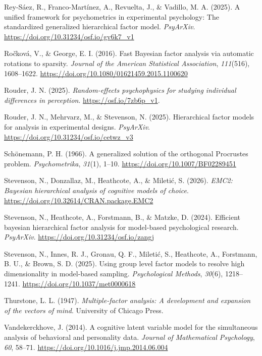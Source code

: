 \documentclass[
  man,
  longtable,
  nolmodern,
  notxfonts,
  notimes,
  colorlinks=true,linkcolor=blue,citecolor=blue,urlcolor=blue]{apa7}
\newlength{\cslhangindent}
\newenvironment{CSLReferences}[2] %
 {\begin{list}{}{%
  \setlength{\itemindent}{0pt}
  \setlength{\leftmargin}{0pt}
  \setlength{\parsep}{0pt}
  \ifodd #1
   \setlength{\leftmargin}{\cslhangindent}
   \setlength{\itemindent}{-1\cslhangindent}
  \fi
  \setlength{\itemsep}{#2\baselineskip}}}
 {\end{list}}
\theoremstyle{plain}
\theoremstyle{plain}
\theoremstyle{remark}
\begin{document}
\begin{CSLReferences}{1}{0}
Rey-Sáez, R., Franco-Martínez, A., Revuelta, J., \& Vadillo, M. A.
(2025). A unified framework for psychometrics in experimental
psychology: The standardized generalized hierarchical factor model.
\emph{PsyArXiv}. \url{https://doi.org/10.31234/osf.io/gv6k7_v1}

Ročková, V., \& George, E. I. (2016). Fast {Bayesian} factor analysis
via automatic rotations to sparsity. \emph{Journal of the American
Statistical Association}, \emph{111}(516), 1608--1622.
\url{https://doi.org/10.1080/01621459.2015.1100620}

Rouder, J. N. (2025). \emph{Random-effects psychophysics for studying
individual differences in perception}. \url{https://osf.io/7zb6p_v1}.

Rouder, J. N., Mehrvarz, M., \& Stevenson, N. (2025). Hierarchical
factor models for analysis in experimental designs. \emph{PsyArXiv}.
\url{https://doi.org/10.31234/osf.io/cetwz_v3}

Schönemann, P. H. (1966). A generalized solution of the orthogonal
{P}rocrustes problem. \emph{Psychometrika}, \emph{31}(1), 1--10.
\url{https://doi.org/10.1007/BF02289451}

Stevenson, N., Donzallaz, M., Heathcote, A., \& Miletić, S. (2026).
\emph{EMC2: Bayesian hierarchical analysis of cognitive models of
choice}. \url{https://doi.org/10.32614/CRAN.package.EMC2}

Stevenson, N., Heathcote, A., Forstmann, B., \& Matzke, D. (2024).
Efficient bayesian hierarchical factor analysis for model-based
psychological research. \emph{PsyArXiv}.
\url{https://doi.org/10.31234/osf.io/zangj}

Stevenson, N., Innes, R. J., Gronau, Q. F., Miletić, S., Heathcote, A.,
Forstmann, B. U., \& Brown, S. D. (2025). Using group level factor
models to resolve high dimensionality in model-based sampling.
\emph{Psychological Methods}, \emph{30}(6), 1218--1241.
\url{https://doi.org/10.1037/met0000618}

Thurstone, L. L. (1947). \emph{Multiple-factor analysis: A development
and expansion of the vectors of mind}. University of Chicago Press.

Vandekerckhove, J. (2014). A cognitive latent variable model for the
simultaneous analysis of behavioral and personality data. \emph{Journal
of Mathematical Psychology}, \emph{60}, 58--71.
\url{https://doi.org/10.1016/j.jmp.2014.06.004}

\end{CSLReferences}
\end{document}
